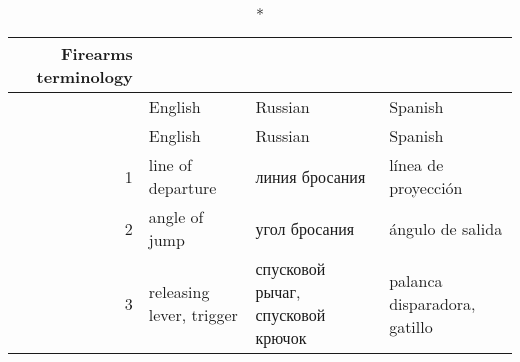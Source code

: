 
\usepackage{longtable}
\usepackage{ragged2e}

\newcommand{\vv}{\\}



{\RaggedRight
\bgroup
\def\arraystretch{1.5}%

\begin{longtable}[c]{rp{1.8in}p{1.8in}p{1.8in}}
 \caption*{Firearms terminology\label{long}}\\

 \hline
 & English & Russian & Spanish\\
 \hline
 \endfirsthead

 \hline
 & English & Russian & Spanish\\
 \hline
 \endhead

 \endfoot

 \endlastfoot

 1 & line of departure & линия бросания & línea de proyección\vv
 2 & angle of jump & угол бросания & ángulo de salida\vv

 3
 & releasing lever, trigger
 & спусковой рычаг, спусковой крючок
 & palanca disparadora, gatillo\vv


\end{longtable}}
